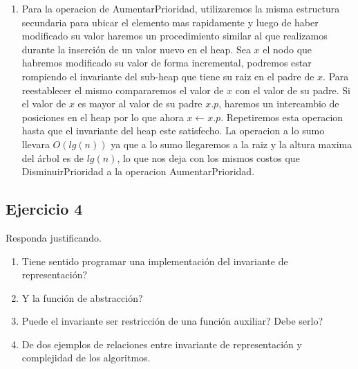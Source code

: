 \documentclass[10pt, a4paper]{article}
\begin{document}
\begin{enumerate}
 \item Para la operacion de AumentarPrioridad, utilizaremos la misma estructura secundaria para ubicar el elemento mas rapidamente y luego de haber modificado su valor haremos un procedimiento similar al que realizamos durante la inserci\'on de un valor nuevo en el heap. Sea $x$ el nodo que habremos modificado su valor de forma incremental, podremos estar rompiendo el invariante del sub-heap que tiene su raiz en el padre de $x$. Para reestablecer el mismo compararemos el valor de $x$ con el valor de su padre. Si el valor de $x$ es mayor al valor de su padre $x.p$, haremos un intercambio de posiciones en el heap por lo que ahora $x \gets x.p$. Repetiremos esta operacion hasta que el invariante del heap este satisfecho. La operacion a lo sumo llevara $O(lg(n))$ ya que a lo sumo llegaremos a la raiz y la altura maxima del \'arbol es de $lg(n)$, lo que nos deja con los mismos costos que DisminuirPrioridad a la operacion AumentarPrioridad.
\end{enumerate}

\subsection*{Ejercicio 4}

Responda justificando.
\begin{enumerate}
 \item Tiene sentido programar una implementaci\'on del invariante de representaci\'on?
 \item Y la funci\'on de abstracci\'on?
 \item Puede el invariante ser restricci\'on de una funci\'on auxiliar? Debe serlo?
 \item De dos ejemplos de relaciones entre invariante de representaci\'on y complejidad de los algoritmos.
\end{enumerate}
\end{document}
